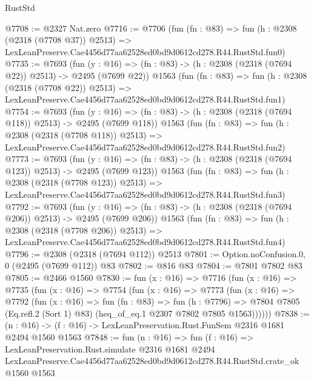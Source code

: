 \begin{lexlean}{RustStd}
\begin{coremodule}
@7708 := @2327 Nat.zero
@7716 := @7706
    (fun (fn : @83) =>
    fun (h : @2308 (@2318 (@7708 @37)) @2513) =>
    LexLeanPreserve.Cae4456d77aa62528ed0bd9d0612cd278.R44.RustStd.fun0)
@7735 := @7693
    (fun (y : @16) => (fn : @83) -> (h : @2308 (@2318 (@7694 @22)) @2513) -> @2495 (@7699 @22))
    @1563
    (fun (fn : @83) =>
    fun (h : @2308 (@2318 (@7708 @22)) @2513) =>
    LexLeanPreserve.Cae4456d77aa62528ed0bd9d0612cd278.R44.RustStd.fun1)
@7754 := @7693
    (fun (y : @16) => (fn : @83) -> (h : @2308 (@2318 (@7694 @118)) @2513) -> @2495 (@7699 @118))
    @1563
    (fun (fn : @83) =>
    fun (h : @2308 (@2318 (@7708 @118)) @2513) =>
    LexLeanPreserve.Cae4456d77aa62528ed0bd9d0612cd278.R44.RustStd.fun2)
@7773 := @7693
    (fun (y : @16) => (fn : @83) -> (h : @2308 (@2318 (@7694 @123)) @2513) -> @2495 (@7699 @123))
    @1563
    (fun (fn : @83) =>
    fun (h : @2308 (@2318 (@7708 @123)) @2513) =>
    LexLeanPreserve.Cae4456d77aa62528ed0bd9d0612cd278.R44.RustStd.fun3)
@7792 := @7693
    (fun (y : @16) => (fn : @83) -> (h : @2308 (@2318 (@7694 @206)) @2513) -> @2495 (@7699 @206))
    @1563
    (fun (fn : @83) =>
    fun (h : @2308 (@2318 (@7708 @206)) @2513) =>
    LexLeanPreserve.Cae4456d77aa62528ed0bd9d0612cd278.R44.RustStd.fun4)
@7796 := @2308 (@2318 (@7694 @112)) @2513
@7801 := Option.noConfusion.{0, 0} (@2495 (@7699 @112)) @83
@7802 := @816 @83
@7804 := @7801 @7802 @83
@7805 := @2466 @1560
@7830 := fun (x : @16) =>
  @7716
    (fun (x : @16) =>
    @7735
      (fun (x : @16) =>
      @7754
        (fun (x : @16) =>
        @7773
          (fun (x : @16) =>
          @7792
            (fun (x : @16) =>
            fun (fn : @83) =>
            fun (h : @7796) =>
            @7804 @7805 (Eq.refl.{2} (Sort 1) @83) (heq_of_eq.{1} @2307 @7802 @7805 @1563))))))
@7838 := (n : @16) -> (f : @16) -> LexLeanPreservation.Rust.FunSem @2316 @1681 @2494 @1560 @1563
@7848 := fun (n : @16) =>
  fun (f : @16) =>
  LexLeanPreservation.Rust.simulate
    @2316
    @1681
    @2494
    LexLeanPreserve.Cae4456d77aa62528ed0bd9d0612cd278.R44.RustStd.crate_ok
    @1560
    @1563
\end{coremodule}
\end{lexlean}
